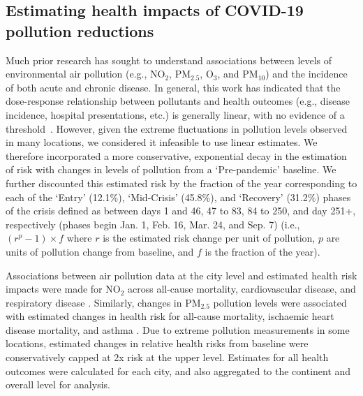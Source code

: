 \documentclass[preprint,10pt]{elsarticle} %
\begin{document}
\subsection*{Estimating health impacts of COVID-19 pollution reductions}
Much prior research has sought to understand associations between levels of environmental air pollution (e.g., NO$_{2}$, PM$_{2.5}$, O$_{3}$, and PM$_{10}$) and the incidence of both acute and chronic disease. In general, this work has indicated that the dose-response relationship between pollutants and health outcomes (e.g., disease incidence, hospital presentations, etc.) is generally linear, with no evidence of a threshold~\cite{schwartz2002concentration}. However, given the extreme fluctuations in pollution levels observed in many locations, we considered it infeasible to use linear estimates. We therefore incorporated a more conservative, exponential decay in the estimation of risk with changes in levels of pollution from a `Pre-pandemic' baseline. We further discounted this estimated risk by the fraction of the year corresponding to each of the `Entry' (12.1\%), `Mid-Crisis' (45.8\%), and `Recovery' (31.2\%) phases of the crisis defined as between days 1 and 46, 47 to 83, 84 to 250, and day 251+, respectively (phases begin Jan. 1, Feb. 16, Mar. 24, and Sep. 7) (i.e., $(r^{p}-1) \times f$ where $r$ is the estimated risk change per unit of pollution, $p$ are units of pollution change from baseline, and $f$ is the fraction of the year). 

Associations between air pollution data at the city level and estimated health risk impacts were made for NO$_{2}$ across all-cause mortality, cardiovascular disease, and respiratory disease \cite{Huang19Pollution}. Similarly, changes in PM$_{2.5}$ pollution levels were associated with estimated changes in health risk for all-cause mortality, ischaemic heart disease mortality, and asthma \cite{Xie257, Yu2020PM2.5, BALTI2014161}. Due to extreme pollution measurements in some locations, estimated changes in relative health risks from baseline were conservatively capped at 2x risk at the upper level. Estimates for all health outcomes were calculated for each city, and also aggregated to the continent and overall level for analysis. 
\end{document}
